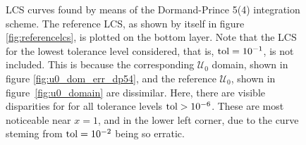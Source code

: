 \begin{figure}[htpb]
    \centering
    
    \caption[LCS curves found by means of the Dormand-Prince 5(4) integration
    scheme]{
        LCS curves found by means of the Dormand-Prince 5(4) integration
        scheme. The reference LCS, as shown by itself in figure
        \ref{fig:referencelcs}, is plotted on the bottom layer. Note that
        the LCS for the lowest tolerance level considered, that is,
        $\textnormal{tol}=10^{-1}$, is not included. This is because the
        corresponding $\mathcal{U}_{0}$ domain, shown in figure
        \ref{fig:u0_dom_err_dp54}, and the reference $\mathcal{U}_{0}$, shown
        in figure~\ref{fig:u0_domain} are dissimilar. Here, there are visible
        disparities for for all tolerance levels $\textnormal{tol}>10^{-6}$.
        These are most noticeable near $x=1$, and in the lower left corner, due
        to the curve steming from $\textnormal{tol}=10^{-2}$ being so erratic.}
    \label{fig:lcs_rkdp54}
\end{figure}
